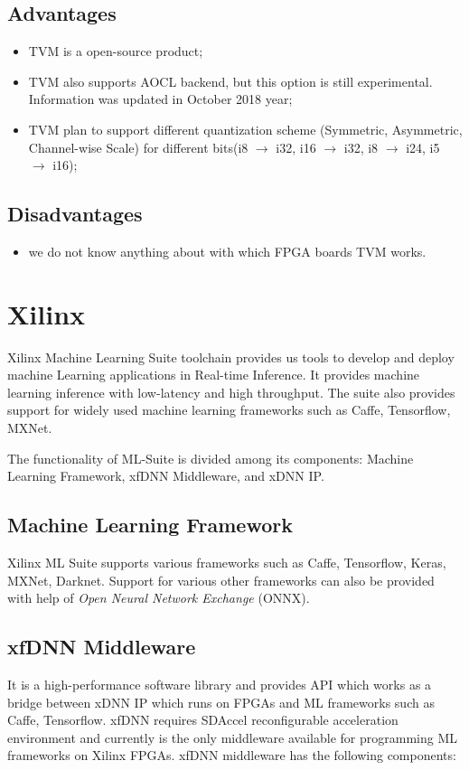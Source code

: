 \documentclass[titlepage]{report}
\begin{document}
 \subsection{Advantages}
 \begin{itemize}
 \item TVM is a open-source product;
 \item TVM also supports AOCL backend, but this option is still experimental. Information was updated in October 2018 year;
  \item TVM plan to support different quantization scheme (Symmetric, Asymmetric, Channel-wise Scale) for different bits(i8 $\to$ i32, i16 $\to$ i32, i8 $\to$ i24, i5 $\to$ i16);
 \end{itemize}

 \subsection{Disadvantages}
 \begin{itemize}
 \item we do not know anything about with which FPGA boards TVM works.
 \end{itemize}

\section{Xilinx}
Xilinx Machine Learning Suite toolchain provides us tools to develop and deploy machine Learning applications in Real-time Inference. It provides machine learning inference with low-latency and high throughput. The suite also provides support for widely used machine learning frameworks such as Caffe, Tensorflow, MXNet.

The functionality of ML-Suite is divided among its components: Machine Learning Framework, xfDNN Middleware, and xDNN IP.

\subsection{Machine Learning Framework}
Xilinx ML Suite supports various frameworks such as Caffe, Tensorflow, Keras, MXNet, Darknet. Support for various other frameworks can also be provided with help of \textit{Open Neural Network Exchange} (ONNX).

\subsection{xfDNN Middleware}
It is a high-performance software library and provides API which works as a bridge between xDNN IP which runs on FPGAs and ML frameworks such as Caffe, Tensorflow. xfDNN requires SDAccel reconfigurable acceleration environment and currently is the only middleware available for programming ML frameworks on Xilinx FPGAs. xfDNN middleware has the following components:
\end{document}
